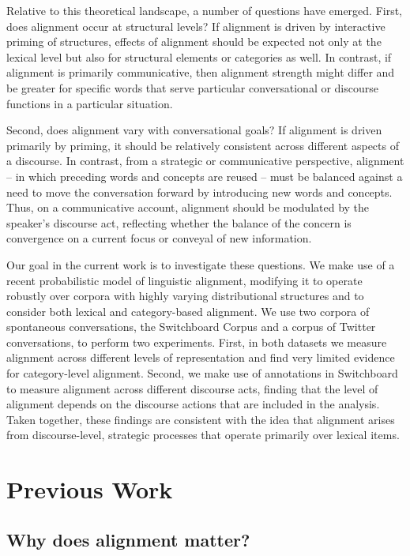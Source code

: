 \documentclass[11pt]{article}
\begin{document}
Relative to this theoretical landscape, a number of questions have emerged. First, does alignment occur at structural levels? If alignment is driven by interactive priming of structures, effects of alignment should be expected not only at the lexical level but also for structural elements or categories as well. In contrast, if alignment is primarily communicative, then alignment strength might differ and be greater for specific words that serve particular conversational or discourse functions in a particular situation.

Second, does alignment vary with conversational goals? If alignment is driven primarily by priming, it should be relatively consistent across different aspects of a discourse. In contrast, from a strategic or communicative perspective, alignment -- in which preceding words and concepts are reused -- must be balanced against a need to move the conversation forward by introducing new words and concepts. Thus, on a communicative account, alignment should be modulated by the speaker's discourse act, reflecting whether the balance of the concern is convergence on a current focus or conveyal of new information.

Our goal in the current work is to investigate these questions. We make use of a recent probabilistic model of linguistic alignment, modifying it to operate robustly over corpora with highly varying distributional structures and to consider both lexical and category-based alignment. We use two corpora of spontaneous conversations, the Switchboard Corpus and a corpus of Twitter conversations, to perform two experiments. First, in both datasets we measure alignment across different levels of representation and find very limited evidence for category-level alignment. Second, we make use of annotations in Switchboard to measure alignment across different discourse acts, finding that the level of alignment depends on the discourse actions that are included in the analysis. Taken together, these findings are consistent with the idea that alignment arises from discourse-level, strategic processes that operate primarily over lexical items.

\section{Previous Work}

\subsection{Why does alignment matter?}
\end{document}
